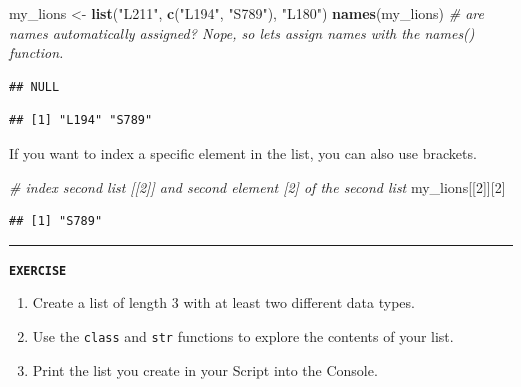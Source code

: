 \documentclass[
]{book}
\newenvironment{Shaded}{\begin{snugshade}}{\end{snugshade}}
\newcommand{\CommentTok}[1]{\textcolor[rgb]{0.56,0.35,0.01}{\textit{#1}}}
\newcommand{\DecValTok}[1]{\textcolor[rgb]{0.00,0.00,0.81}{#1}}
\newcommand{\FunctionTok}[1]{\textcolor[rgb]{0.13,0.29,0.53}{\textbf{#1}}}
\newcommand{\NormalTok}[1]{#1}
\newcommand{\OtherTok}[1]{\textcolor[rgb]{0.56,0.35,0.01}{#1}}
\newcommand{\SpecialCharTok}[1]{\textcolor[rgb]{0.81,0.36,0.00}{\textbf{#1}}}
\newcommand{\StringTok}[1]{\textcolor[rgb]{0.31,0.60,0.02}{#1}}
\providecommand{\tightlist}{%
  \setlength{\itemsep}{0pt}\setlength{\parskip}{0pt}}
\begin{document}
\begin{Shaded}
\begin{Highlighting}[]
\NormalTok{my\_lions }\OtherTok{\textless{}{-}} \FunctionTok{list}\NormalTok{(}\StringTok{"L211"}\NormalTok{, }\FunctionTok{c}\NormalTok{(}\StringTok{"L194"}\NormalTok{, }\StringTok{"S789"}\NormalTok{), }\StringTok{"L180"}\NormalTok{)}
\FunctionTok{names}\NormalTok{(my\_lions) }\CommentTok{\# are names automatically assigned? Nope, so let\textquotesingle{}s assign names with the names() function.}
\end{Highlighting}
\end{Shaded}

\begin{verbatim}
## NULL
\end{verbatim}

\begin{Shaded}
\end{Shaded}

\begin{verbatim}
## [1] "L194" "S789"
\end{verbatim}

If you want to index a specific element in the list, you can also use brackets.

\begin{Shaded}
\begin{Highlighting}[]
\CommentTok{\# index second list [[2]] and second element [2] of the second list}
\NormalTok{my\_lions[[}\DecValTok{2}\NormalTok{]][}\DecValTok{2}\NormalTok{]}
\end{Highlighting}
\end{Shaded}

\begin{verbatim}
## [1] "S789"
\end{verbatim}

\begin{center}\rule{0.5\linewidth}{0.5pt}\end{center}

\textbf{\texttt{EXERCISE}}

\begin{enumerate}
\def\labelenumi{\arabic{enumi}.}
\tightlist
\item
  Create a list of length 3 with at least two different data types.
\item
  Use the \texttt{class} and \texttt{str} functions to explore the contents of your list.
\item
  Print the list you create in your Script into the Console.
\end{enumerate}
\end{document}
